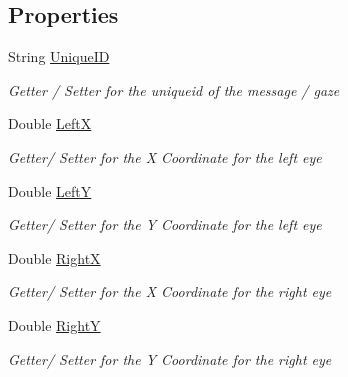 \subsection*{Properties}
\begin{DoxyCompactItemize}
\item 
String \hyperlink{class_web_analyzer_1_1_models_1_1_message_model_1_1_data_message_af8ea083fd4035d8c786f5da12bc01917}{Unique\+I\+D}
\begin{DoxyCompactList}\small\item\em Getter / Setter for the uniqueid of the message / gaze \end{DoxyCompactList}\item 
Double \hyperlink{class_web_analyzer_1_1_models_1_1_message_model_1_1_data_message_adadb413f3e7d845538561b2a65596722}{Left\+X}
\begin{DoxyCompactList}\small\item\em Getter/ Setter for the X Coordinate for the left eye \end{DoxyCompactList}\item 
Double \hyperlink{class_web_analyzer_1_1_models_1_1_message_model_1_1_data_message_a409dc72ec09e601fbbd9dc4db680932c}{Left\+Y}
\begin{DoxyCompactList}\small\item\em Getter/ Setter for the Y Coordinate for the left eye \end{DoxyCompactList}\item 
Double \hyperlink{class_web_analyzer_1_1_models_1_1_message_model_1_1_data_message_ab650b2ca778810b8a6fbd0d7530318a9}{Right\+X}
\begin{DoxyCompactList}\small\item\em Getter/ Setter for the X Coordinate for the right eye \end{DoxyCompactList}\item 
Double \hyperlink{class_web_analyzer_1_1_models_1_1_message_model_1_1_data_message_a3b554f231e24414cfa625552ff2635df}{Right\+Y}
\begin{DoxyCompactList}\small\item\em Getter/ Setter for the Y Coordinate for the right eye \end{DoxyCompactList}\end{DoxyCompactItemize}
